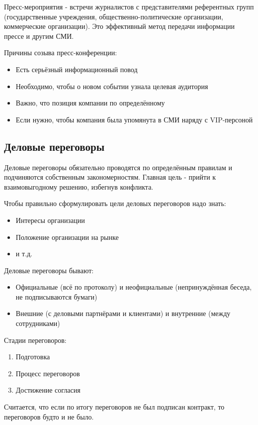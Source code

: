 Пресс-мероприятия - встречи журналистов с представителями референтных групп (государственные учреждения, общественно-политические организации, коммерческие организации). Это эффективный метод передачи информации прессе и другим СМИ.

Причины созыва пресс-конференции:
\begin{itemize}
    \item Есть серьёзный информационный повод
    \item Необходимо, чтобы о новом событии узнала целевая аудитория
    \item Важно, что позиция компании по определённому \missed{}
    \item Если нужно, чтобы компания была упомянута в СМИ наряду с VIP-персоной
\end{itemize}

\subsection{Деловые переговоры}

Деловые переговоры обязательно проводятся по определённым правилам и подчиняются собственным закономерностям.
Главная цель - прийти к взаимовыгодному решению, избегнув конфликта.

Чтобы правильно сформулировать цели деловых переговоров надо знать:
\begin{itemize}
    \item Интересы организации
    \item Положение организации на рынке
    \item и т.д.
\end{itemize}

Деловые переговоры бывают:
\begin{itemize}
    \item Официальные (всё по протоколу) и неофициальные (непринуждённая беседа, не подписываются бумаги)
    \item Внешние (с деловыми партнёрами и клиентами) и внутренние (между сотрудниками)
\end{itemize}

Стадии переговоров:
\begin{enumerate}
    \item Подготовка
    \item Процесс переговоров
    \item Достижение согласия
\end{enumerate}

Считается, что если по итогу переговоров не был подписан контракт, то переговоров будто и не было.

